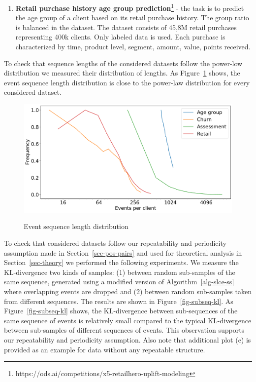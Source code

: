 \documentclass{article}
\begin{document}
\begin{enumerate}
    \item \textbf{Retail purchase history age group prediction}\footnote{https://ods.ai/competitions/x5-retailhero-uplift-modeling} - the task is to predict the age group of a client based on its retail purchase history. The group ratio is balanced in the dataset. The dataset consists of 45,8M retail purchases representing 400k clients. Only labeled data is used. Each purchase is characterized by time, product level, segment, amount, value, points received.

\end{enumerate}

To check that sequence lengths of the considered datasets follow the power-low distribution we measured their distribution of lengths. As Figure~\ref{fig-seq-len} shows, the event sequence length distribution is close to the power-law distribution for every considered dataset.

\begin{figure}
  \centering
  \caption{Event sequence length distribution}
  \includegraphics[width=\linewidth]{figures/all_scenario_events_per_client.pdf}
  \label{fig-seq-len}
\end{figure}

To check that considered datasets follow our repeatability and periodicity assumption made in Section~\ref{sec-pos-pairs} and used for theoretical analysis in Section~\ref{sec-theory} we performed the following experiments. We measure the KL-divergence two kinds of samples: (1) between random sub-samples of the same sequence, generated using a modified version of Algorithm~\ref{alg-slce-ss} where overlapping events are dropped and (2) between random sub-samples taken from different sequences. The results are shown in Figure~\ref{fig-subseq-kl}. As Figure~\ref{fig-subseq-kl} shows, the KL-divergence between sub-sequences of the same sequence of events is relatively small compared to the typical KL-divergence between sub-samples of different sequences of events. This observation supports our repeatability and periodicity assumption.
Also note that additional plot (e) is provided as an example for data without any repeatable structure.
\end{document}
